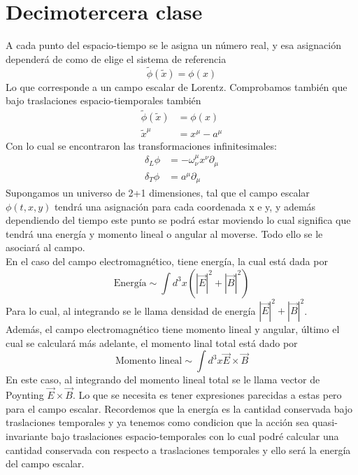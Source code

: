 \documentclass[../main.tex]{subfiles}
\begin{document}
\section{Decimotercera clase}
A cada punto del espacio-tiempo se le asigna un número real, y esa asignación dependerá de como de elige el sistema de referencia
\begin{equation*}
  \tilde{\phi}(\tilde{x}) = \phi(x)
\end{equation*}
Lo que corresponde a un campo escalar de Lorentz. Comprobamos también que bajo traslaciones espacio-tiemporales  también
\begin{align*}
  \tilde{\phi}(\tilde{x}) & = \phi(x) \\
  \tilde{x}^\mu & = x^\mu - a^\mu
\end{align*}
Con lo cual se encontraron las transformaciones infinitesimales:
\begin{align*}
  \delta_L \phi & = -\omega^\mu_\nu x^\nu \partial_\mu \\
  \delta_T \phi & = a^\mu \partial_\mu
\end{align*}
Supongamos un universo de 2+1 dimensiones, tal que el campo escalar $\phi(t,x,y)$ tendrá una asignación para cada coordenada x e y, y además dependiendo del tiempo este punto se podrá estar moviendo lo cual significa que tendrá una energía y momento lineal o angular al moverse. Todo ello se le asociará al campo. \\ 
En el caso del campo electromagnético, tiene energía, la cual está dada por
\begin{equation}
  \text{Energía}\sim \int d^3 x \left( |\vec{E}|^2 + |\vec{B}|^2 \right)
\end{equation}
Para lo cual, al integrando se le llama densidad de energía $ |\vec{E}|^2 + |\vec{B}|^2 $. \\
Además, el campo electromagnético tiene momento lineal y angular, último el cual se calculará más adelante, el momento linal total está dado por
\begin{equation}
  \text{Momento lineal}\sim \int d^3 x \vec{E}\times \vec{B}
\end{equation}
En este caso, al integrando del momento lineal total se le llama vector de Poynting $\vec{E}\times \vec{B}$. Lo que se necesita es tener expresiones parecidas a estas pero para el campo escalar. Recordemos que la energía es la cantidad conservada bajo traslaciones temporales y ya tenemos como condicion que la acción sea quasi-invariante bajo traslaciones espacio-temporales con lo cual podré calcular una cantidad conservada con respecto a traslaciones temporales y ello será la energía del campo escalar. \\
\end{document}
